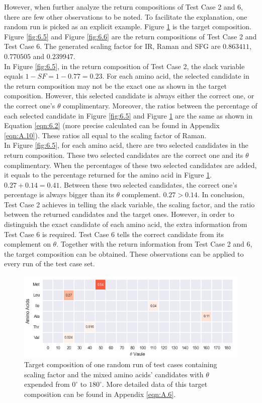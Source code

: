 However, when further analyze the return compositions of Test Case 2 and 6, there are few other observations to be noted. To facilitate the explanation, one random run is picked as an explicit example. Figure \ref{fig:6.4} is the target composition. Figure \ref{fig:6.5} and Figure \ref{fig:6.6} are the return compositions of Test Case 2 and Test Case 6. The generated scaling factor for IR, Raman and SFG are $0.863411$, $0.770505$ and $0.239947$. \\

In Figure \ref{fig:6.5}, in the return composition of Test Case 2, the slack variable equals $1-SF = 1-0.77 = 0.23$. For each amino acid, the selected candidate in the return composition may not be the exact one as shown in the target composition. However, this selected candidate is always either the correct one, or the correct one's $\theta$ complimentary. Moreover, the ratios between the percentage of each selected candidate in Figure \ref{fig:6.5} and Figure \ref{fig:6.4} are the same as shown in Equation \ref{eqn:6.2} (more precise calculated can be found in Appendix \ref{eqn:A.10}). These ratios all equal to the scaling factor of Raman. \\

In Figure \ref{fig:6.5}, for each amino acid, there are two selected candidates in the return composition. These two selected candidates are the correct one and its $\theta$ complimentary. When the percentages of these two selected candidates are added, it equals to the percentage returned for the amino acid in Figure \ref{fig:6.4}. $0.27 + 0.14 = 0.41$. Between these two selected candidates, the correct one's percentage is always bigger than its $\theta$ complement. $0.27 > 0.14$. In conclusion, Test Case 2 achieves in telling the slack variable, the scaling factor, and the ratio between the returned candidates and the target ones. However, in order to distinguish the exact candidate of each amino acid, the extra information from Test Case 6 is required. Test Case 6 tells the correct candidate from its complement on $\theta$. Together with the return information from Test Case 2 and 6, the target composition can be obtained. These observations can be applied to every run of the test case set.\\


\begin{figure}[!ht] 
\centering
\includegraphics[scale=0.9]{Figures/chapter6_figure_five.png}
\caption{Target composition of  one random run of test cases containing scaling factor and the mixed amino acids' candidates with $\theta$ expended from $0^{\circ}$ to $180^{\circ}$. More detailed data of this target composition can be found in Appendix \ref{eqn:A.6}.} \label{fig:6.4}
\end{figure}

